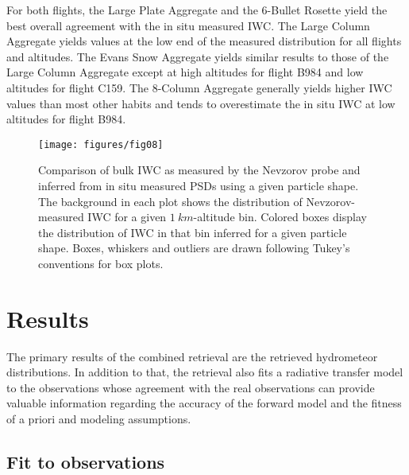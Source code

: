 \documentclass[journal abbreviation, manuscript]{copernicus}
\providecommand{\DIFadd}[1]{{\protect\color{blue}\uwave{#1}}} %
\providecommand{\DIFaddbegin}{} %
\providecommand{\DIFaddend}{} %
\begin{document}
For both flights, the Large Plate Aggregate and the 6-Bullet Rosette yield
the best overall agreement with the in situ measured IWC. The Large Column
Aggregate yields values at the low end of the measured distribution for all
flights and altitudes. The Evans Snow Aggregate yields similar results to those
of the Large Column Aggregate except at high altitudes for flight B984 and low
altitudes for flight C159. The 8-Column Aggregate generally yields higher IWC
values than most other habits and tends to overestimate the in situ IWC at low
altitudes for flight B984.

\begin{figure}
  \centering
  \texttt{[image: figures/fig08]}
  \caption{ Comparison of bulk IWC as measured by the Nevzorov probe and
    inferred from in situ measured PSDs using a given particle shape. The
    background in each plot shows the distribution of Nevzorov-measured IWC for
    a given $1\ \unit{km}$-altitude bin. Colored boxes display the distribution
    of IWC in that bin inferred for a given particle shape. Boxes, whiskers and
    outliers are drawn following Tukey's conventions for box plots.}
  \label{fig:mass_size_relation}
\end{figure}


\section{Results}
\label{sec:results}

The primary results of the combined retrieval are the retrieved hydrometeor
\DIFaddbegin \DIFadd{size }\DIFaddend distributions. In addition to that, the retrieval also fits a radiative transfer
model to the observations whose agreement with the real observations can provide
valuable information regarding the accuracy of the forward model and the fitness
of a priori and modeling assumptions.

\subsection{Fit to observations}
\end{document}
